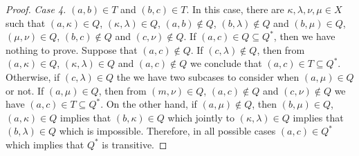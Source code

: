 \documentclass{article}
\theoremstyle{definition}
\begin{document}
\begin{proof}
\par\smallskip\par\noindent
{\it Case 4.} $(a,b)\in T$ and $(b,c)\in T$. In this case, there are $\kappa, \lambda, \nu, \mu\in X$
such that 
$(a,\kappa)\in Q$, $(\kappa,\lambda)\in Q$, $(a,b)\notin Q$, $(b,\lambda)\notin Q$
and
$(b,\mu)\in Q$, $(\mu,\nu)\in Q$, $(b,c)\notin Q$ and $(c,\nu)\notin Q$.
If $(a,c)\in Q\subseteq Q^{\ast}$, then we have nothing to prove.
Suppose that $(a,c)\notin Q$.
If $(c,\lambda)\notin Q$, then from $(a,\kappa)\in Q$, $(\kappa,\lambda)\in Q$ and
$(a,c)\notin Q$ we conclude that $(a,c)\in T\subseteq Q^{\ast}$.
Otherwise, if 
$(c,\lambda)\in Q$ the we have two subcases to consider when $(a,\mu)\in Q$ or not.
If $(a,\mu)\in Q$, then from $(m,\nu)\in Q$, $(a,c)\notin Q$ and $(c,\nu)\notin Q$ we have
$(a,c)\in T\subseteq Q^{\ast}$. On the other hand, if $(a,\mu)\notin Q$, then
$(b,\mu)\in Q$, $(a,\kappa)\in Q$ implies that $(b,\kappa)\in Q$ which jointly to $(\kappa,\lambda)\in Q$ implies that $(b,\lambda)\in Q$ which is impossible.
Therefore, in all possible cases $(a,c)\in Q^{\ast}$ which implies that $Q^{\ast}$ is transitive.


\end{proof}
\end{document}
